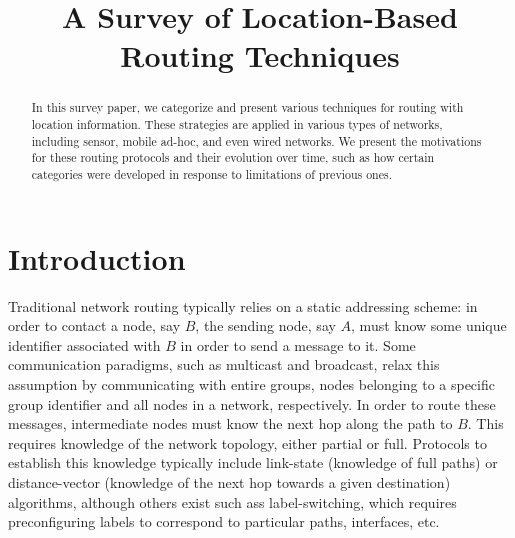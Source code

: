 \documentclass[conference]{IEEEtran}
\begin{document}
%
\title{A Survey of Location-Based Routing Techniques}

\author{
}



\maketitle



\begin{abstract}
In this survey paper, we categorize and present various techniques for routing with location information.
These strategies are applied in various types of networks, including sensor, mobile ad-hoc, and even wired networks.
We present the motivations for these routing protocols and their evolution over time, such as how certain categories were developed in response to limitations of previous ones.
\end{abstract}

%
\IEEEpeerreviewmaketitle



\section{Introduction}

Traditional network routing typically relies on a static addressing scheme: in order to contact a node, say $B$, the sending node, say $A$, must know some unique identifier associated with $B$ in order to send a message to it.
Some communication paradigms, such as multicast and broadcast, relax this assumption by communicating with entire groups, nodes belonging to a specific group identifier and all nodes in a network, respectively.
In order to route these messages, intermediate nodes must know the next hop along the path to $B$.
This requires knowledge of the network topology, either partial or full.
Protocols to establish this knowledge typically include link-state (knowledge of full paths) or distance-vector (knowledge of the next hop towards a given destination) algorithms, although others exist such ass label-switching, which requires preconfiguring labels to correspond to particular paths, interfaces, etc.
\end{document}
